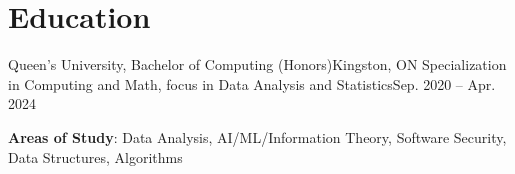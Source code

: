 \section{Education}
  \resumeSubHeadingListStart
    \resumeSubheading
      {Queen's University, Bachelor of Computing (Honors)}{Kingston, ON}
      {Specialization in Computing and Math, focus in Data Analysis and Statistics}{Sep. 2020 -- Apr. 2024}
      \begin{itemize}[leftmargin=0.0in, label={}]
    \small{\item{
     \textbf{Areas of Study}{: Data Analysis, AI/ML/Information Theory, Software Security, Data Structures, Algorithms}
    }}
 \end{itemize}
  \resumeSubHeadingListEnd